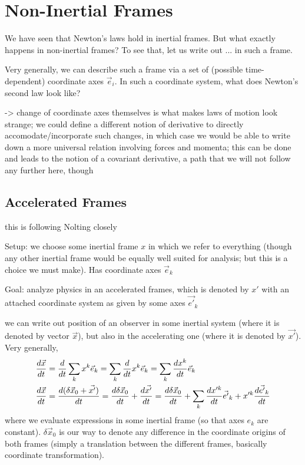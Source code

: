 \documentclass[../class_mech_main.tex]{subfiles}
\begin{document}
\newpage



    \section{Non-Inertial Frames}

We have seen that Newton's laws hold in inertial frames. But what exactly happens in non-inertial frames? To see that, let us write out ... in such a frame.

Very generally, we can describe such a frame via a set of (possible time-dependent) coordinate axes $\vec{e}_i$. In such a coordinate system, what does Newton's second law look like?


-> change of coordinate axes themselves is what makes laws of motion look strange; we could define a different notion of derivative to directly accomodate/incorporate such changes, in which case we would be able to write down a more universal relation involving forces and momenta; this can be done and leads to the notion of a covariant derivative, a path that we will not follow any further here, though



        \subsection{Accelerated Frames}
this is following Nolting closely


Setup: we choose some inertial frame $x$ in which we refer to everything (though any other inertial frame would be equally well suited for analysis; but this is a choice we must make). Has coordinate axes $\vec{e}_k$

Goal: analyze physics in an accelerated frames, which is denoted by $x'$ with an attached coordinate system as given by some axes $\vec{e'}_k$


we can write out position of an observer in some inertial system (where it is denoted by vector $\vec{x}$), but also in the accelerating one (where it is denoted by $\vec{x'}$). Very generally,
\begin{align}
    \dv{\vec{x}}{t} &= \dv{t} \sum_k x^k \vec{e}_k = \sum_k \dv{t} x^k \vec{e}_k = \sum_k \dv{x^k}{t} \vec{e}_k
    \\
    \dv{\vec{x}}{t} &= \dv{(\delta \vec{x}_0 + \vec{x'})}{t} = \dv{\delta \vec{x}_0}{t} + \dv{\vec{x'}}{t} = \dv{\delta \vec{x}_0}{t} + \sum_k \dv{x'^k}{t} \vec{e'}_k + x'^k \dv{\vec{e'}_k}{t}
    \label{eq:velocity_accel_frame}
\end{align}
where we evaluate expressions in some inertial frame (so that axes $e_k$ are constant). $\delta \vec{x}_0$ is our way to denote any difference in the coordinate origins of both frames (simply a translation between the different frames, basically coordinate transformation).
\end{document}
